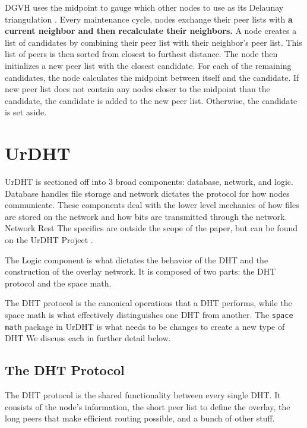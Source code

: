 \documentclass[11pt,conference]{IEEEtran}
\begin{document}
DGVH uses the midpoint to gauge which other nodes to use as its Delaunay triangulation \cite{dgvh}.
Every maintenance cycle, nodes exchange their peer lists with\textbf{ a current neighbor and then recalculate their neighbors.  }
A node creates a list of candidates by combining their peer list with  their neighbor's peer list.
This list of peers is then sorted from closest to furthest distance.
The node then initializes a new peer list with the closest candidate.
For each of the remaining candidates, the node calculates the midpoint between itself and the candidate.
If new peer list does not contain any nodes closer to the midpoint than the candidate, the candidate is added to the new peer list.
Otherwise, the candidate is set aside.



\section{UrDHT}
\label{sec:urdht}
	
	
	UrDHT is sectioned off into 3 broad components: database, network, and logic.
	Database handles file storage and network dictates the protocol for how nodes communicate.
	These components deal with the lower level mechanics of how files are stored on the network and how bits are transmitted through the network.
	Network Rest
	The specifics are outside the scope of the paper, but can be found on the UrDHT Project \cite{urdht}.
	
	The Logic component is what dictates the behavior of the DHT and the construction of the overlay network.
	It is composed of two parts: the DHT protocol and the space math.
	
	The DHT protocol is the canonical operations that a DHT performs, while the space math is what effectively distinguishes one DHT from another.
	The \texttt{space math} package in UrDHT is what needs to be changes to create a new type of DHT
	We discuss each in further detail below.
	
	
	\subsection{The DHT Protocol }
	The DHT protocol is the shared functionality between every single DHT.
	It consists of the node's information, the short peer list to define the overlay, the long peers that make efficient routing possible, and a bunch of other stuff.
	
\end{document}
